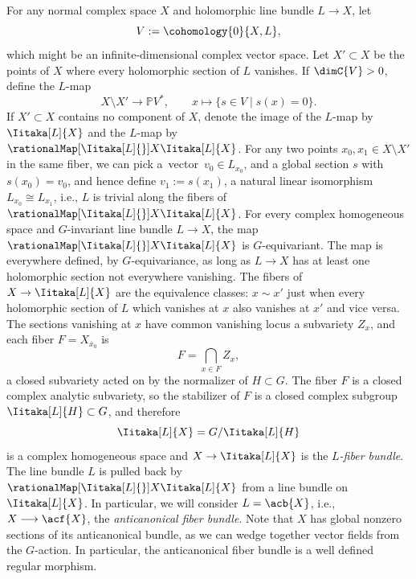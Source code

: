 For any normal complex space $X$ and holomorphic line bundle $L \to X$, let
\[
V := \cohomology{0}{X, L},
\]
which might be an infinite-dimensional complex vector space.
Let $X' \subset X$ be the points of $X$ where every holomorphic section of $L$ vanishes.
If $\dimC{ V} > 0$, define the $L$-map
\[
X\setminus X' \longrightarrow \mathbb{P}V^*, \qquad x \longmapsto \{s \in V\mid s(x)=0\}.
\]
If $X' \subset X$ contains no component of $X$, denote the image of the $L$-map by $\Iitaka[L]{X}$ and the $L$-map
by~$\rationalMap[\Iitaka[L]{}]{X}{\Iitaka[L]{X}}$.
For any two points $x_0, x_1 \in X\setminus X'$ in the same fiber, we can pick a~vector~${v_0 \in L_{x_0}}$, and a global
section $s$ with $s(x_0) = v_0$, and hence define $v_1 := s(x_1)$, a natural linear isomorphism $L_{x_0}
 \cong L_{x_1}$, i.e., $L$ is trivial along the fibers of $\rationalMap[\Iitaka[L]{}]{X}{\Iitaka[L]{X}}$.
For every complex homogeneous space  and $G$-invariant line bundle $L \to X$, the map $\rationalMap[\Iitaka[L]{}]{X}{\Iitaka[L]{X}}$ is $G$-equivariant.
The map is everywhere defined, by $G$-equivariance, as long as $L\to X$ has at least one holomorphic section not everywhere vanishing.
The fibers of $X \to \Iitaka[L]{X}$ are the equivalence classes: $x \sim x'$ just when every holomorphic section of $L$ which vanishes at $x$ also vanishes at $x'$ and vice versa.
The sections vanishing at $x$ have common vanishing locus a subvariety $Z_x$, and each fiber $F = X_{\overline{x}_0}$ is
\[
F = \bigcap_{x \in F} Z_x,
\]
a closed subvariety acted on by the normalizer of $H \subset G$.
The fiber $F$ is a closed complex analytic subvariety, so the stabilizer of $F$ is a closed complex subgroup $\Iitaka[L]{H}
 \subset G$, and therefore
 \[\Iitaka[L]{X} = G/\Iitaka[L]{H}\]
 is a complex homogeneous space and $X \to \Iitaka[L]{X}$ is the \emph{$L$-fiber bundle}.
The line bundle $L$ is pulled back by $\rationalMap[\Iitaka[L]{}]{X}{\Iitaka[L]{X}}$ from a line bundle on $\Iitaka[L]{X}$.
In particular, we will consider $L = \acb{X}$, i.e., $X \longrightarrow \acf{X}$, the \emph{anticanonical fiber bundle}.
Note that $X$ has global nonzero sections of its anticanonical bundle, as we can wedge together vector fields from the $G$-action.
In particular, the anticanonical fiber bundle is a well defined regular morphism.
